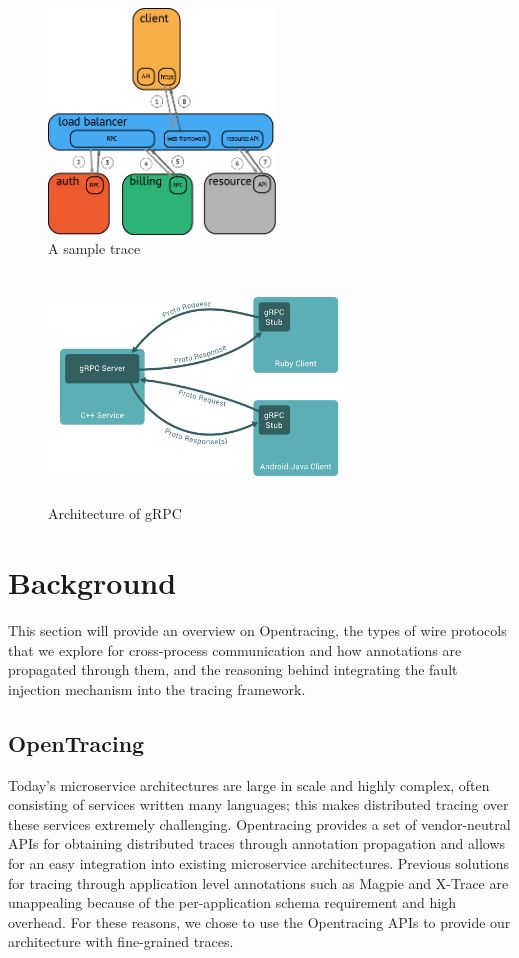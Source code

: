 

\begin{figure}
\centering
\includegraphics[width=\textwidth,height=6cm,keepaspectratio=true]{basic_trace}
\caption{A sample trace}
\label{basic_trace}
\end{figure}

\begin{figure}
\centering
\includegraphics[width=8cm,height=6cm,keepaspectratio=true]{grpc_arch}
\caption{Architecture of gRPC}
\label{grpc_arch}
\end{figure}


\section{Background}
This section will provide an overview on Opentracing, the 
types of wire protocols that we explore for cross-process communication
and how annotations are propagated through them, and the reasoning behind 
integrating the fault injection mechanism into the tracing framework.


\subsection{OpenTracing}
Today's microservice architectures are large in scale and highly complex, often consisting 
of services written many languages; this makes distributed tracing over these services
extremely challenging. Opentracing\cite{opentracing:doc} provides a set of vendor-neutral
APIs for obtaining distributed traces through annotation propagation and allows for an easy
integration into existing microservice architectures. Previous solutions for tracing through
application level annotations such as Magpie\cite{magpie} and X-Trace\cite{xtrace} are unappealing
because of the per-application schema requirement and high overhead\cite{sigelman:dapper}. For these reasons,
we chose to use the Opentracing APIs to provide our architecture with fine-grained traces. 



